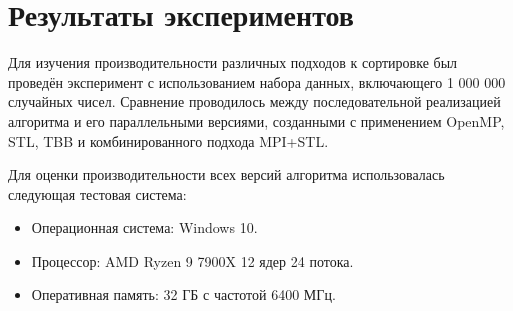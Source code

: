 \documentclass[12pt]{article}
\begin{document}
\newpage

\section{Результаты экспериментов}
Для изучения производительности различных подходов к сортировке был проведён эксперимент с использованием набора данных, включающего 1 000 000 случайных чисел. Сравнение проводилось между последовательной реализацией алгоритма и его параллельными версиями, созданными с применением OpenMP, STL, TBB и комбинированного подхода MPI+STL.

Для оценки производительности всех версий алгоритма использовалась следующая тестовая система:
\begin{itemize}
    \item Операционная система: Windows 10.
    \item Процессор: AMD Ryzen 9 7900X 12 ядер 24 потока.
    \item Оперативная память: 32 ГБ с частотой 6400 МГц.
\end{itemize}
\end{document}

